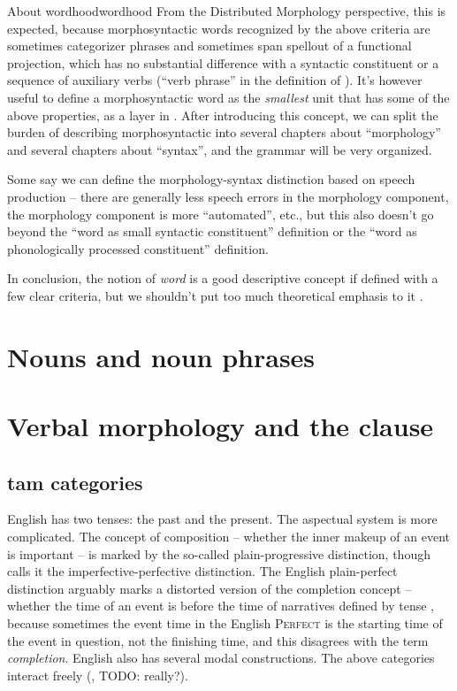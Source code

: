 \documentclass[UTF8, a4paper, oneside, scheme=plain]{ctexrep}
\newcommand*{\citesec}[1]{\S~{#1}}
\newcommand*{\term}[1]{\emph{#1}}
\newcommand{\category}[1]{\textsc{#1}}
\begin{document}
\begin{theorybox}{About wordhood}{wordhood}
    From the Distributed Morphology perspective,
    this is expected,
    because morphosyntactic words recognized by the above criteria 
    are sometimes categorizer phrases and sometimes span spellout of a functional projection,
    which has no substantial difference with a syntactic constituent or 
    a sequence of auxiliary verbs
    (``verb phrase'' in the definition of \citet{dixon2009basic1}).
    It's however useful to define a morphosyntactic word as the \emph{smallest} unit 
    that has some of the above properties,
    as a layer in .
    After introducing this concept,
    we can split the burden of describing morphosyntactic 
    into several chapters about ``morphology''
    and several chapters about ``syntax'',
    and the grammar will be very organized.

    Some say we can define the morphology-syntax distinction based on speech production -- 
    there are generally less speech errors in the morphology component,
    the morphology component is more ``automated'', etc.,
    but this also doesn't go beyond the ``word as small syntactic constituent'' definition 
    or the ``word as phonologically processed constituent'' definition.

    In conclusion, the notion of \term{word} is a good descriptive concept
    if defined with a few clear criteria,
    but we shouldn't put too much theoretical emphasis to it \citep{bruening2018lexicalist}.
\end{theorybox}

\section{Nouns and noun phrases}

\section{Verbal morphology and the clause}

\subsection{\acs{tam} categories}

English has two tenses: the past and the present.
The aspectual system is more complicated. 
The concept of composition 
-- whether the inner makeup of an event is important \citep[\citesec{19.10}]{dixon2012basic3} -- 
is marked by the so-called plain-progressive distinction,
though \citep{dixon2012basic3} calls it the imperfective-perfective distinction.
The English plain-perfect distinction arguably marks 
a distorted version of the completion concept 
-- whether the time of an event is before the time of narratives defined by tense 
\citep[\citesec{19.7}]{dixon2012basic3},
because sometimes the event time in the English \category{Perfect} 
is the starting time of the event in question,
not the finishing time,
and this disagrees with the term \term{completion}.
English also has several modal constructions.
The above categories interact freely (, TODO: really?).
\end{document}
